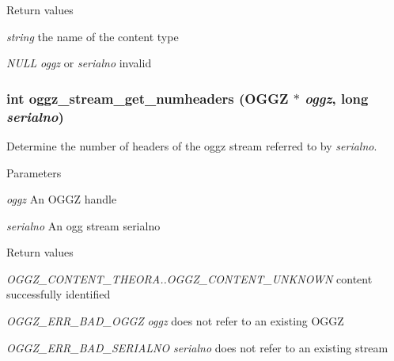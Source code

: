 \begin{DoxyRetVals}{Return values}
\item[{\em string}]the name of the content type \item[{\em NULL}]{\itshape oggz\/} or {\itshape serialno\/} invalid \end{DoxyRetVals}
\subsubsection[{oggz\_\-stream\_\-get\_\-numheaders}]{\setlength{\rightskip}{0pt plus 5cm}int oggz\_\-stream\_\-get\_\-numheaders ({\bf OGGZ} $\ast$ {\em oggz}, \/  long {\em serialno})}\label{oggz__read_8h_ae3b1aa364b5bf0d7b331aab70646ab10}


Determine the number of headers of the oggz stream referred to by {\itshape serialno\/}. 


\begin{DoxyParams}{Parameters}
\item[{\em oggz}]An OGGZ handle \item[{\em serialno}]An ogg stream serialno \end{DoxyParams}

\begin{DoxyRetVals}{Return values}
\item[{\em OGGZ\_\-CONTENT\_\-THEORA..OGGZ\_\-CONTENT\_\-UNKNOWN}]content successfully identified \item[{\em OGGZ\_\-ERR\_\-BAD\_\-OGGZ}]{\itshape oggz\/} does not refer to an existing OGGZ \item[{\em OGGZ\_\-ERR\_\-BAD\_\-SERIALNO}]{\itshape serialno\/} does not refer to an existing stream \end{DoxyRetVals}
